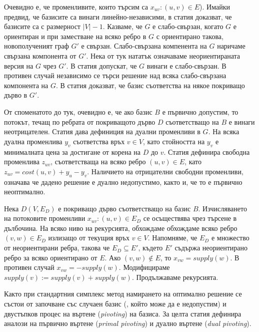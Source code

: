 \documentclass[a4paper,12pt]{article}
\begin{document}
\bigbreak

Очевидно е, че променливите, които търсим са $x_{uv}: (u, v) \in E$). Имайки предвид, че базисите са винаги линейно-независими, в статия \cite{networksimplexmethod} доказват, че базисите са с размерност $|V|-1$. Казваме, че $G$ е слабо-свързан, когато $G$ е ориентиран и при заместване на всяко ребро в $G$ с ориентирано такова, новополученият граф $G'$ е свързан. Слабо-свързана компенента на $G$ наричаме свързана компонента от $G'$. Нека от тук нататък означаваме неориентираната версия на $G$ чрез $G'$. В статия \cite{networksimplexmethod} допускат, че $G$ винаги е слабо-свързан. В противен случай независимо се търси решение над всяка слабо-свързана компонента на $G$. В статия \cite{networksimplexmethod} доказват, че базис съответства на някое покриващо дърво в $G'$.

\bigbreak

От споменатото до тук, очевидно е, че ако базис $B$ е първично допустим, то потокът, течащ по ребрата от покриващото дърво $D$ съответстващо на $B$ е винаги неотрицателен. Статия \cite{networksimplexmethod} дава дефиниция на дуални променливи в $G$. На всяка дуална променлива $y_v$ съответства връх $v \in V$, като стойността на $y_v$ е минималната цена за достигане от корена на $D$ до $v$. Статия \cite{networksimplexmethod} дефинира свободна променлива $z_{uv}$, съответстваща на всяко ребро $(u, v) \in E$, като $z_{uv} = cost(u, v) + y_u - y_v$. Наличието на отрицателни свободни променливи, означава че дадено решение е дуално недопустимо, както и, че то е първично неоптимално.

\bigbreak

Нека $D(V, E_D)$ е покриващо дърво съответстващо на базис $B$. Изчисляването на потоковите променливи $x_{uv}: (u, v) \in E_D$ се осъществява чрез търсене в дълбочина. На всяко ниво на рекурсията, обхождаме обхождаме всяко ребро $(v, w) \in E_D$ излизащо от текущия връх $v \in V$. Напомняме, че $E_D$ е множество от неориентирани ребра, такова че $E_D \subseteq E'$, където $E'$ съдържа неориентирано ребро за всяко ориентирано от $E$. Ако $(v, w) \notin E$, то $x_{vw} = supply(w)$. В противен случай $x_{vw} = -supply(w)$. Модифицираме $supply(v) := supply(v) + supply(w)$. Продължаваме рекурсията.

\bigbreak

Както при стандартния симплекс метод намирането на оптимално решение се състои от започване със случаен базис (, който може да е недопустим) и двустъпков процес на въртене (\textit{pivoting}) на базиса. За целта статия \cite{networksimplexmethod} дефинира аналози на първично въртене (\textit{primal pivoting}) и дуално въртене (\textit{dual pivoting}).
\end{document}
